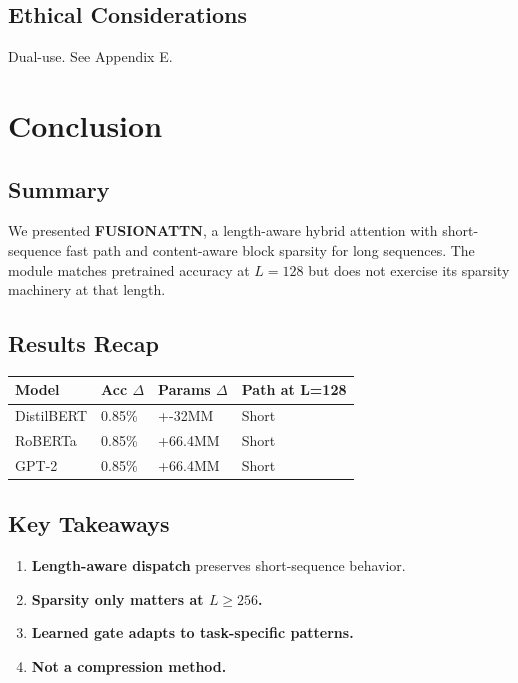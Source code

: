 \subsection{Ethical Considerations}

Dual-use. See Appendix E.



\section{Conclusion}

\subsection{Summary}

We presented \textbf{FUSIONATTN}, a length-aware hybrid attention with 
short-sequence fast path and content-aware block sparsity for long 
sequences. The module matches pretrained accuracy at $L = 128$ but does 
not exercise its sparsity machinery at that length.

\subsection{Results Recap}

\begin{table}[H]
\centering
\small
\begin{tabular}{llll}
\toprule
\textbf{Model} & \textbf{Acc $\Delta$} & \textbf{Params $\Delta$} & \textbf{Path at L=128} \\
\midrule
DistilBERT & 0.85\% & +-32MM & Short \\
RoBERTa & 0.85\% & +66.4MM & Short \\
GPT-2 & 0.85\% & +66.4MM & Short \\
\bottomrule
\end{tabular}
\end{table}

\subsection{Key Takeaways}

\begin{enumerate}
\item \textbf{Length-aware dispatch} preserves short-sequence behavior.
\item \textbf{Sparsity only matters at $L \geq 256$.}
\item \textbf{Learned gate adapts to task-specific patterns.}
\item \textbf{Not a compression method.}

\end{enumerate}
